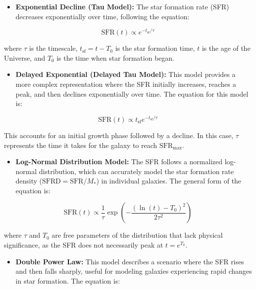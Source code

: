 \documentclass[
]{article}
\providecommand{\tightlist}{%
  \setlength{\itemsep}{0pt}\setlength{\parskip}{0pt}}\usepackage{longtable,booktabs,array}
\begin{document}
\begin{itemize}
\tightlist
\item
  \textbf{Exponential Decline (Tau Model):} The star formation rate
  (SFR) decreases exponentially over time, following the equation:
\end{itemize}

\[
  \text{SFR}(t) \propto e^{-t_{\text{sf}}/\tau}
\]

where \(\tau\) is the timescale, \(t_{\text{sf}} = t - T_0\) is the star
formation time, \(t\) is the age of the Universe, and \(T_0\) is the
time when star formation began.

\begin{itemize}
\tightlist
\item
  \textbf{Delayed Exponential (Delayed Tau Model):} This model provides
  a more complex representation where the SFR initially increases,
  reaches a peak, and then declines exponentially over time. The
  equation for this model is:
\end{itemize}

\[
  \text{SFR}(t) \propto t_{\text{sf}} e^{-t_{\text{sf}}/\tau}
\]

This accounts for an initial growth phase followed by a decline. In this
case, \(\tau\) represents the time it takes for the galaxy to reach
\(\text{SFR}_{\text{max}}\).

\begin{itemize}
\tightlist
\item
  \textbf{Log-Normal Distribution Model:} The SFR follows a normalized
  log-normal distribution, which can accurately model the star formation
  rate density (\(\text{SFRD} = \text{SFR}/M_*\)) in individual
  galaxies. The general form of the equation is:
\end{itemize}

\[
  \text{SFR}(t) \propto \frac{1}{\tau} \exp\left(-\frac{(\ln(t) - T_0)^2}{2\tau^2}\right)
\]

where \(\tau\) and \(T_0\) are free parameters of the distribution that
lack physical significance, as the SFR does not necessarily peak at
\(t = e^{T_0}\).

\begin{itemize}
\tightlist
\item
  \textbf{Double Power Law:} This model describes a scenario where the
  SFR rises and then falls sharply, useful for modeling galaxies
  experiencing rapid changes in star formation. The equation is:
\end{itemize}
\end{document}
